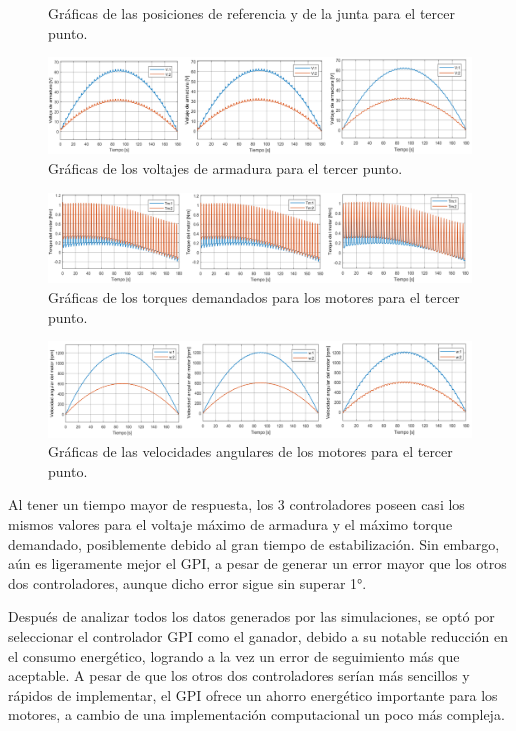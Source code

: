 \begin{itemize}
\begin{figure}[H]
    	\caption{Gráficas de las posiciones de referencia y de la junta para el tercer punto.}
    	\label{fig:control16}
    \end{figure}
    \begin{figure}[H]
    	\centering
    	\includegraphics[width=13.5cm]{imagenes/control17}
    	\caption{Gráficas de los voltajes de armadura para el tercer punto.}
    	\label{fig:control17}
    \end{figure}
    \begin{figure}[H]
    	\centering
    	\includegraphics[width=\columnwidth]{imagenes/control18}
    	\caption{Gráficas de los torques demandados para los motores para el tercer punto.}
    	\label{fig:control18}
    \end{figure}
    \begin{figure}[H]
    	\centering
    	\includegraphics[width=13.5cm]{imagenes/control19}
    	\caption{Gráficas de las velocidades angulares de los motores para el tercer punto.}
    	\label{fig:control19}
    \end{figure}
Al tener un tiempo mayor de respuesta, los 3 controladores poseen casi los mismos valores para el voltaje máximo de armadura y el máximo torque demandado, posiblemente debido al gran tiempo de estabilización. Sin embargo, aún es ligeramente mejor el GPI, a pesar de generar un error mayor que los otros dos controladores, aunque dicho error sigue sin superar 1°.

Después de analizar todos los datos generados por las simulaciones, se optó por seleccionar el controlador GPI como el ganador, debido a su notable reducción en el consumo energético, logrando a la vez un error de seguimiento más que aceptable. A pesar de que los otros dos controladores serían más sencillos y rápidos de implementar, el GPI ofrece un ahorro energético importante para los motores, a cambio de una implementación computacional un poco más compleja. 
\end{itemize}

